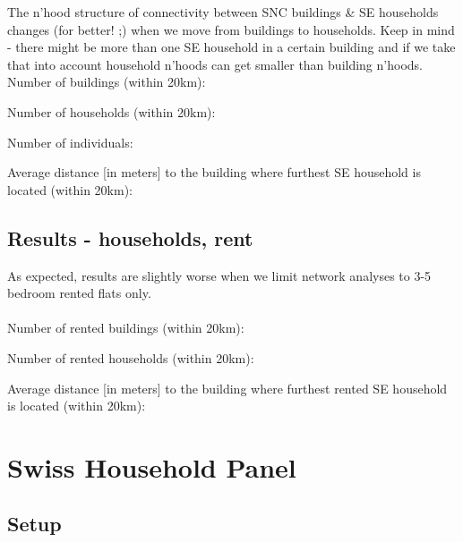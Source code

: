 \documentclass[a4paper, notitlepage, fleqn]{article} %
\begin{document}
The n'hood structure of connectivity between SNC buildings \& SE households changes (for better! ;)
when we move from buildings to households. 
Keep in mind - there might be more than one SE household in a certain building and if we take that into account 
household n'hoods can get smaller than building n'hoods. 
Number of buildings (within 20km):
\begin{stlog}\end{stlog}
Number of households (within 20km):
\begin{stlog}\end{stlog}
Number of individuals:
\begin{stlog}\end{stlog}
Average distance [in meters] to the building where furthest SE household is located (within 20km):
\begin{stlog}\end{stlog}
\subsection{Results - households, rent}

As expected, results are slightly worse when we limit network analyses to 3-5 bedroom rented flats only. \\
\\
Number of rented buildings (within 20km):
\begin{stlog}\end{stlog}
Number of rented households (within 20km):
\begin{stlog}\end{stlog}
Average distance [in meters] to the building where furthest rented SE household is located (within 20km):
\begin{stlog}\end{stlog}
\newpage
\section{Swiss Household Panel}

\subsection{Setup}
\end{document}
